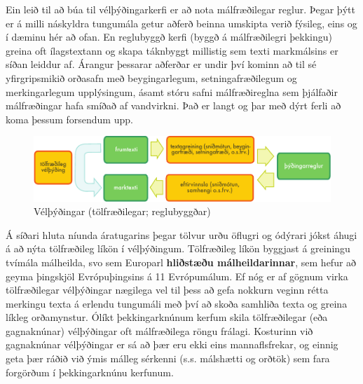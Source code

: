 \documentclass{../../metanetpaper}
\begin{document}
\begin{multicols}{2}
Ein leið til að búa til vélþýðingarkerfi er að nota málfræðilegar reglur. Þegar þýtt er á milli náskyldra tungumála getur aðferð beinna umskipta verið fýsileg, eins og í dæminu hér að ofan. En reglubyggð kerfi (byggð á málfræðilegri þekkingu) greina oft ílagstextann og skapa táknbyggt millistig sem texti markmálsins er síðan leiddur af. Árangur þessarar aðferðar er undir því kominn að til sé yfirgripsmikið orðasafn með beygingarlegum, setningafræðilegum og merkingarlegum upplýsingum, ásamt stóru safni málfræðireglna sem þjálfaðir málfræðingar hafa smíðað af vandvirkni. Það er langt og þar með dýrt ferli að koma þessum forsendum upp.

\begin{figure}[htb]
  \center
  \includegraphics[width=\textwidth]{../_media/icelandic/machine_translation}
  \caption{Vélþýðingar (tölfræðilegar; reglubyggðar)}
  \label{fig:mtarch_is}
\end{figure}

Á síðari hluta níunda áratugarins þegar tölvur urðu öflugri og ódýrari jókst áhugi á að nýta tölfræðileg líkön í vélþýðingum. Tölfræðileg líkön byggjast á greiningu tvímála málheilda, svo sem Europarl \textbf{hliðstæðu málheildarinnar}, sem hefur að geyma þingskjöl Evrópuþingsins á 11 Evrópumálum. Ef nóg er af gögnum virka tölfræðilegar vélþýðingar nægilega vel til þess að gefa nokkurn veginn rétta merkingu texta á erlendu tungumáli með því að skoða samhliða texta og greina líkleg orðamynstur. Ólíkt þekkingarknúnum kerfum skila tölfræðilegar (eða gagnaknúnar) vélþýðingar oft málfræðilega röngu frálagi. Kosturinn við gagnaknúnar vélþýðingar er sá að þær eru ekki eins mannaflsfrekar, og einnig geta þær ráðið við ýmis málleg sérkenni (s.s. málshætti og orðtök) sem fara forgörðum í þekkingarknúnu kerfunum.


\end{multicols}
\end{document}
